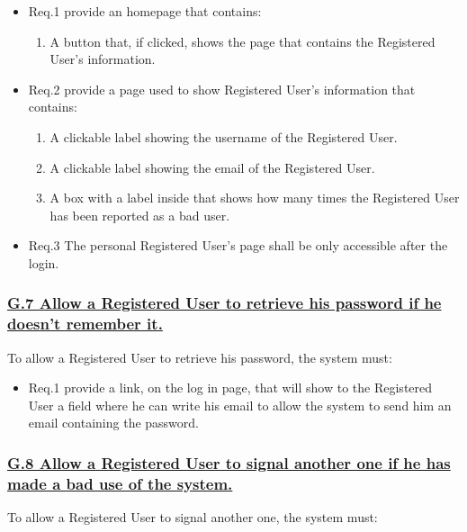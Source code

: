 				\begin{itemize}
					\item \lbrack Req.1\rbrack \label{sec:fr1_g6} provide an homepage that contains:
						\begin{enumerate}
							\item A button that, if clicked, shows the page that contains the Registered User's information.
						\end{enumerate}
					\item \lbrack Req.2\rbrack \label{sec:fr2_g6} provide a page used to show Registered User's information that contains:
						\begin{enumerate}
							\item A clickable label showing the username of the Registered User.
							\item A clickable label showing the email of the Registered User.
							\item A box with a label inside that shows how many times the Registered User has been reported as a bad user.
						\end{enumerate}
					\item \lbrack Req.3\rbrack \label{sec:fr3_g6} The personal Registered User's page shall be only accessible after the login.
				\end{itemize}

			\subsubsection{\lbrack \hyperref[sec:g7]{G.7 Allow a Registered User to retrieve his password if he doesn't remember it.}\rbrack}\label{sec:frs7}
			To allow a Registered User to retrieve his password, the system must:

				\begin{itemize}
					\item \lbrack Req.1\rbrack \label{sec:fr1_g7}  provide a link, on the log in page, that will show to the Registered User a field where he can write his email to allow the system to send him an email containing the password.
				\end{itemize}

			\subsubsection{\lbrack \hyperref[sec:g8]{G.8 Allow a Registered User to signal another one if he has made a bad use of the system.}\rbrack}\label{sec:frs8}
			To allow a Registered User to signal another one, the system must:

